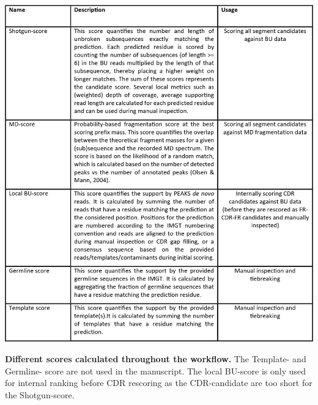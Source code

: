 \begin{subappendices}
  \begin{table}[!hbt]
    \includegraphics[]{Chapter.5/Figures/ts3.png}
    \caption{
      \textbf{Different scores calculated throughout the workflow.} The Template- and Germline- score are not used in the manuscript. The local BU-score is only used for internal ranking before CDR rescoring as the CDR-candidate are too short for the Shotgun-score.
    }
    \label{tab:tabs5.3}
  \end{table}



\end{subappendices}
